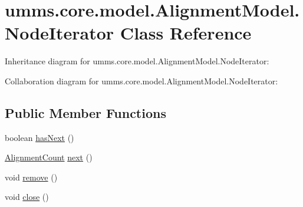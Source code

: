 \hypertarget{classumms_1_1core_1_1model_1_1_alignment_model_1_1_node_iterator}{\section{umms.\+core.\+model.\+Alignment\+Model.\+Node\+Iterator Class Reference}
\label{classumms_1_1core_1_1model_1_1_alignment_model_1_1_node_iterator}
}


Inheritance diagram for umms.\+core.\+model.\+Alignment\+Model.\+Node\+Iterator\+:


Collaboration diagram for umms.\+core.\+model.\+Alignment\+Model.\+Node\+Iterator\+:
\subsection*{Public Member Functions}
\begin{DoxyCompactItemize}
\item 
boolean \hyperlink{classumms_1_1core_1_1model_1_1_alignment_model_1_1_node_iterator_a4a563025dd5173a7ceaa14747761e701}{has\+Next} ()
\item 
\hyperlink{classumms_1_1core_1_1model_1_1_alignment_model_1_1_alignment_count}{Alignment\+Count} \hyperlink{classumms_1_1core_1_1model_1_1_alignment_model_1_1_node_iterator_a081da2c292900baa393c5dc67a0e71e2}{next} ()
\item 
void \hyperlink{classumms_1_1core_1_1model_1_1_alignment_model_1_1_node_iterator_a9f7118991d1d5dcf7cd255c1754b2b87}{remove} ()
\item 
void \hyperlink{classumms_1_1core_1_1model_1_1_alignment_model_1_1_node_iterator_a7c83272b03c1e7284a2683bddf41af35}{close} ()
\end{DoxyCompactItemize}


